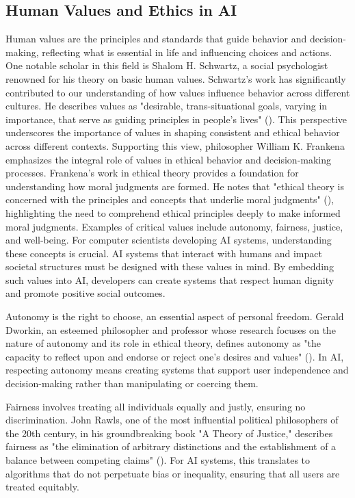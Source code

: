 \documentclass[
  letterpaper,
  numbers=noenddot,
  DIV=11,
  oneside]{scrreprt}
\theoremstyle{remark}
\begin{document}
\subsection{Human Values and Ethics in
AI}\label{human-values-and-ethics-in-ai}

Human values are the principles and standards that guide behavior and
decision-making, reflecting what is essential in life and influencing
choices and actions. One notable scholar in this field is Shalom H.
Schwartz, a social psychologist renowned for his theory on basic human
values. Schwartz's work has significantly contributed to our
understanding of how values influence behavior across different
cultures. He describes values as "desirable, trans-situational goals,
varying in importance, that serve as guiding principles in people's
lives" (). This
perspective underscores the importance of values in shaping consistent
and ethical behavior across different contexts. Supporting this view,
philosopher William K. Frankena emphasizes the integral role of values
in ethical behavior and decision-making processes. Frankena's work in
ethical theory provides a foundation for understanding how moral
judgments are formed. He notes that "ethical theory is concerned with
the principles and concepts that underlie moral judgments"
(), highlighting the
need to comprehend ethical principles deeply to make informed moral
judgments. Examples of critical values include autonomy, fairness,
justice, and well-being. For computer scientists developing AI systems,
understanding these concepts is crucial. AI systems that interact with
humans and impact societal structures must be designed with these values
in mind. By embedding such values into AI, developers can create systems
that respect human dignity and promote positive social outcomes.

Autonomy is the right to choose, an essential aspect of personal
freedom. Gerald Dworkin, an esteemed philosopher and professor whose
research focuses on the nature of autonomy and its role in ethical
theory, defines autonomy as "the capacity to reflect upon and endorse or
reject one's desires and values"
(). In AI, respecting
autonomy means creating systems that support user independence and
decision-making rather than manipulating or coercing them.

Fairness involves treating all individuals equally and justly, ensuring
no discrimination. John Rawls, one of the most influential political
philosophers of the 20th century, in his groundbreaking book "A Theory
of Justice," describes fairness as "the elimination of arbitrary
distinctions and the establishment of a balance between competing
claims" (). For AI systems,
this translates to algorithms that do not perpetuate bias or inequality,
ensuring that all users are treated equitably.
\end{document}
